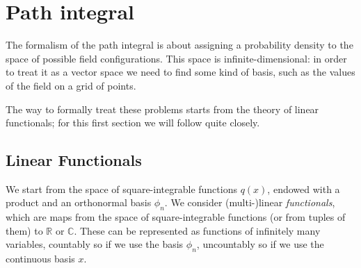 \documentclass[main.tex]{subfiles}
\begin{document}
\section{Path integral} \label{sec:path-integral}



The formalism of the path integral is about assigning a probability density to the space of possible field configurations. 
This space is infinite-dimensional: in order to treat it as a vector space we need to find some kind of basis, such as the values of the field on a grid of points. 

The way to formally treat these problems starts from the theory of linear functionals; for this first section we will follow \textcite[]{zaidiFunctionalMethods1983} quite closely.

\subsection{Linear Functionals}


We start from the space of square-integrable functions \(q(x)\), endowed with a product and an orthonormal basis \(\phi _n\).
We consider (multi-)linear \emph{functionals}, which are maps from the space of square-integrable functions (or from tuples of them) to \(\mathbb{R}\) or \(\mathbb{C}\). 
These can be represented as functions of infinitely many variables, countably so if we use the basis \(\phi _n\), uncountably so if we use the continuous basis \(x\).
\end{document}

